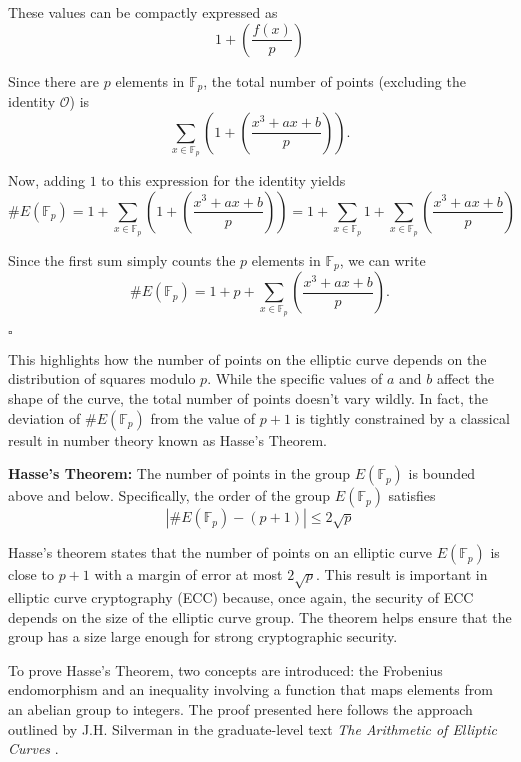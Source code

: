 \documentclass[11pt]{article}
\begin{document}
These values can be compactly expressed as
\[1 + \left( \frac{f(x)}{p} \right)\]

Since there are \( p \) elements in \( \mathbb{F}_p \), the total number of points (excluding the identity \(\mathcal{O}\)) is
\[\sum_{x \in \mathbb{F}_p} \left( 1 + \left( \frac{x^3 + ax + b}{p} \right) \right).\]

Now, adding \(1\) to this expression for the identity yields
\[\#E(\mathbb{F}_p) = 1 + \sum_{x \in \mathbb{F}_p} \left( 1 + \left( \frac{x^3 + ax + b}{p} \right) \right)=1 + \sum_{x \in \mathbb{F}_p} 1 +\sum_{x \in \mathbb{F}_p} \left( \frac{x^3 + ax + b}{p} \right)\]

Since the first sum simply counts the \(p\) elements in \(\mathbb{F}_p\), we can write
\[\#E(\mathbb{F}_p) = 1 + p +\sum_{x \in \mathbb{F}_p} \left( \frac{x^3 + ax + b}{p} \right).\]

\hfill \(\square\)

This highlights how the number of points on the elliptic curve depends on the distribution of squares modulo \(p\). While the specific values of \(a\) and \(b\) affect the shape of the curve, the total number of points doesn’t vary wildly. In fact, the deviation of \(\#E(\mathbb{F}_p)\) from the value of \(p + 1\) is tightly constrained by a classical result in number theory known as Hasse's Theorem.

\vspace{0.3cm}


\textbf{Hasse's Theorem: } The number of points in the group \(E(\mathbb{F}_p)\) is bounded above and below. Specifically, the order of the group \(E(\mathbb{F}_p)\) satisfies
\[|\#E(\mathbb{F}_p)-(p+1)|\leq2\sqrt{p}\]

Hasse's theorem states that the number of points on an elliptic curve \(E(\mathbb{F}_p)\) is close to \(p+1\) with a margin of error at most \(2\sqrt{p}\). This result is important in elliptic curve cryptography (ECC) because, once again, the security of ECC depends on the size of the elliptic curve group. The theorem helps ensure that the group has a size large enough for strong cryptographic security. 

\vspace{0.3cm}

To prove Hasse's Theorem, two concepts are introduced: the Frobenius endomorphism and an inequality involving a function that maps elements from an abelian group to integers. The proof presented here follows the approach outlined by J.H. Silverman in the graduate-level text \textit{The Arithmetic of Elliptic Curves} \cite{silverman}.
\end{document}
